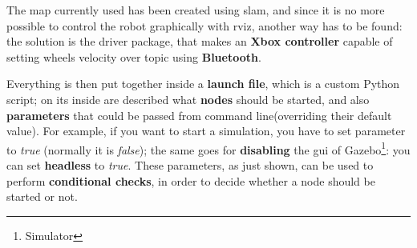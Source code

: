 The map currently used has been created using \acrshort{slam}, and since it is no more possible to control the robot graphically with \acrshort{rviz}, another way has to be found: the solution is the  driver package, that makes an \textbf{Xbox controller} capable of setting wheels velocity over  topic using \textbf{Bluetooth}.

Everything is then put together inside a \textbf{launch file}, which is a custom Python script; on its inside are described what \textbf{nodes} should be started, and also \textbf{parameters} that could be passed from command line(overriding their default value). For example, if you want to start a simulation, you have to set  parameter to \textit{true} (normally it is \textit{false}); the same goes for \textbf{disabling} the \acrfull{gui} of Gazebo\footnote{Simulator}: you can set \textbf{headless} to \textit{true}. These parameters, as just shown, can be used to perform \textbf{conditional checks}, in order to decide whether a node should be started or not.